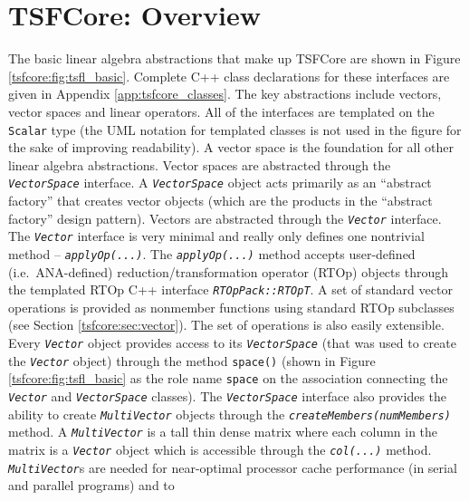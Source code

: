 %
\section{TSFCore: Overview}
\label{tsfcore:sec:TSFCore_core_overview}
%

The basic linear algebra abstractions that make up TSFCore are shown
in Figure {}\ref{tsfcore:fig:tsfl_basic}.  Complete C++ class
declarations for these interfaces are given in Appendix
{}\ref{app:tsfcore_classes}.  The key abstractions include vectors,
vector spaces and linear operators.  All of the interfaces are
templated on the {}\texttt{Scalar} type (the UML notation for
templated classes is not used in the figure for the sake of improving
readability).  A vector space is the foundation for all other linear
algebra abstractions.  Vector spaces are abstracted through the
{}\texttt{\textit{VectorSpace}} interface.  A
{}\texttt{\textit{VectorSpace}} object acts primarily as an ``abstract
factory'' {}\cite{ref:gama_et_al_1995} that creates vector objects
(which are the products in the ``abstract factory'' design pattern).
Vectors are abstracted through the {}\texttt{\textit{Vector}}
interface.  The {}\texttt{\textit{Vector}} interface is very minimal
and really only defines one nontrivial method --
{}\texttt{\textit{applyOp(\-...)}}.  The
{}\texttt{\textit{applyOp(\-...)}} method accepts user-defined
(i.e.~ANA-defined) reduction/transformation operator (RTOp) objects
through the templated RTOp C++ interface
{}\texttt{\textit{RTOpPack::RTOpT}}.  A set of standard vector
operations is provided as nonmember functions using standard RTOp
subclasses (see Section {}\ref{tsfcore:sec:vector}).  The set of
operations is also easily extensible.  Every
{}\texttt{\textit{Vector}} object provides access to its
{}\texttt{\textit{VectorSpace}} (that was used to create the
{}\texttt{\textit{Vector}} object) through the method
{}\texttt{space()} (shown in Figure {}\ref{tsfcore:fig:tsfl_basic} as
the role name {}\texttt{space} on the association connecting the
{}\texttt{\textit{Vector}} and {}\texttt{\textit{VectorSpace}}
classes).  The {}\texttt{\textit{VectorSpace}} interface also provides
the ability to create {}\texttt{\textit{Multi\-Vector}} objects
through the {}\texttt{\textit{createMembers(numMembers)}} method.  A
{}\texttt{\textit{Multi\-Vector}} is a tall thin dense matrix where
each column in the matrix is a {}\texttt{\textit{Vector}} object which
is accessible through the {}\texttt{\textit{col(...)}} method.
{}\texttt{\textit{Multi\-Vector}}s are needed for near-optimal
processor cache performance (in serial and parallel programs) and to
